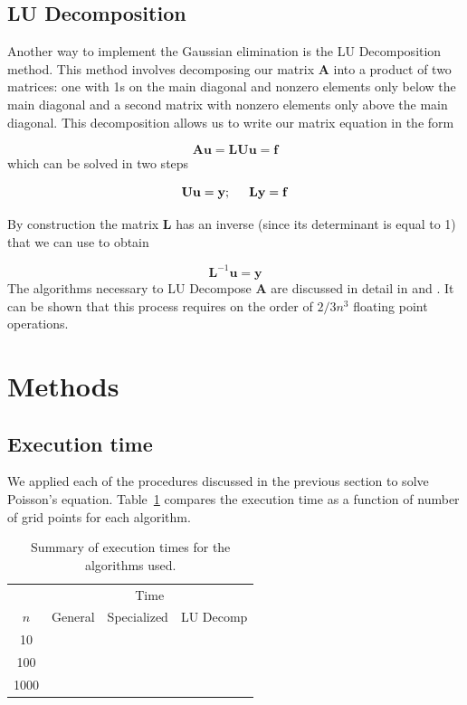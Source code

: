 \documentclass[10pt,showpacs,preprintnumbers,footinbib,amsmath,amssymb,aps,prl,twocolumn,groupedaddress,superscriptaddress,showkeys]{revtex4-1}
\begin{document}
\subsection*{LU Decomposition}

Another way to implement the Gaussian elimination is the LU Decomposition method.
This method involves decomposing our matrix $\mathbf{A}$ into a product of two
matrices: one with 1s on the main diagonal and nonzero elements only below the
main diagonal and a second matrix with nonzero elements only above the main
diagonal. This decomposition allows us to write our matrix equation in the form

\begin{equation*}
	\mathbf{A u} = \mathbf{LU u} = \mathbf{f}
\end{equation*}
which can be solved in two steps

\begin{equation*}
	\mathbf{U u} = \mathbf{y}; \hspace{0.5cm} \mathbf{L y} = \mathbf{f}
\end{equation*}

By construction the matrix $\mathbf{L}$ has an inverse (since its determinant
is equal to 1) that we can use to obtain

\begin{equation*}
	\mathbf{L}^{-1} \mathbf{u} = \mathbf{y}
\end{equation*}
The algorithms necessary to LU Decompose $\mathbf{A}$ are discussed in detail
in \citep{Morten} and \citep{Golub1996}. It can be shown that this process
requires on the order of $2/3 n^3$ floating point operations.

\section{Methods}

\subsection{Execution time}

We applied each of the procedures discussed in the previous section to solve
Poisson's equation. Table~\ref{tab:speedresults} compares the execution time
as a function of number of grid points for each algorithm.

\begin{table}
\centering
	\begin{tabular}{ c | c c c }
	 & \multicolumn{3}{c}{Time}\\
	$n$ & General & Specialized & LU Decomp\\
\hline
	10   & & & \\
	100  & & & \\
	1000 & & & \\
\hline
	\end{tabular}
	\caption{Summary of execution times for the algorithms used.}
	\label{tab:speedresults}
\end{table}
\end{document}
